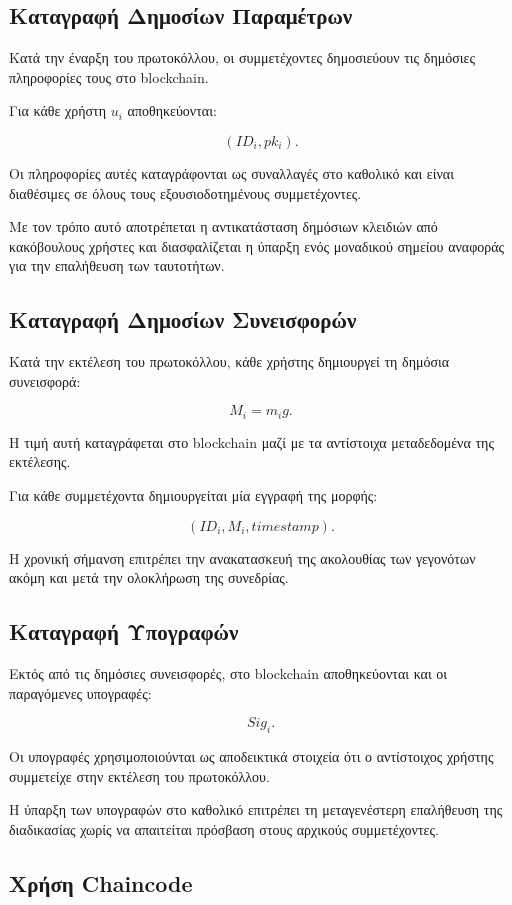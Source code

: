 \documentclass[12pt,a4paper]{report}
\begin{document}
\subsection{Καταγραφή Δημοσίων Παραμέτρων}

Κατά την έναρξη του πρωτοκόλλου, οι συμμετέχοντες δημοσιεύουν τις δημόσιες πληροφορίες τους στο blockchain.

Για κάθε χρήστη $u_i$ αποθηκεύονται:

\[
(ID_i,pk_i).
\]

Οι πληροφορίες αυτές καταγράφονται ως συναλλαγές στο καθολικό και είναι διαθέσιμες σε όλους τους εξουσιοδοτημένους συμμετέχοντες.

Με τον τρόπο αυτό αποτρέπεται η αντικατάσταση δημόσιων κλειδιών από κακόβουλους χρήστες και διασφαλίζεται η ύπαρξη ενός μοναδικού σημείου αναφοράς για την επαλήθευση των ταυτοτήτων.

\subsection{Καταγραφή Δημοσίων Συνεισφορών}

Κατά την εκτέλεση του πρωτοκόλλου, κάθε χρήστης δημιουργεί τη δημόσια συνεισφορά:

\[
M_i=m_i g.
\]

Η τιμή αυτή καταγράφεται στο blockchain μαζί με τα αντίστοιχα μεταδεδομένα της εκτέλεσης.

Για κάθε συμμετέχοντα δημιουργείται μία εγγραφή της μορφής:

\[
(ID_i,M_i,timestamp).
\]

Η χρονική σήμανση επιτρέπει την ανακατασκευή της ακολουθίας των γεγονότων ακόμη και μετά την ολοκλήρωση της συνεδρίας.

\subsection{Καταγραφή Υπογραφών}

Εκτός από τις δημόσιες συνεισφορές, στο blockchain αποθηκεύονται και οι παραγόμενες υπογραφές:

\[
Sig_i.
\]

Οι υπογραφές χρησιμοποιούνται ως αποδεικτικά στοιχεία ότι ο αντίστοιχος χρήστης συμμετείχε στην εκτέλεση του πρωτοκόλλου.

Η ύπαρξη των υπογραφών στο καθολικό επιτρέπει τη μεταγενέστερη επαλήθευση της διαδικασίας χωρίς να απαιτείται πρόσβαση στους αρχικούς συμμετέχοντες.

\subsection{Χρήση Chaincode}
\end{document}

